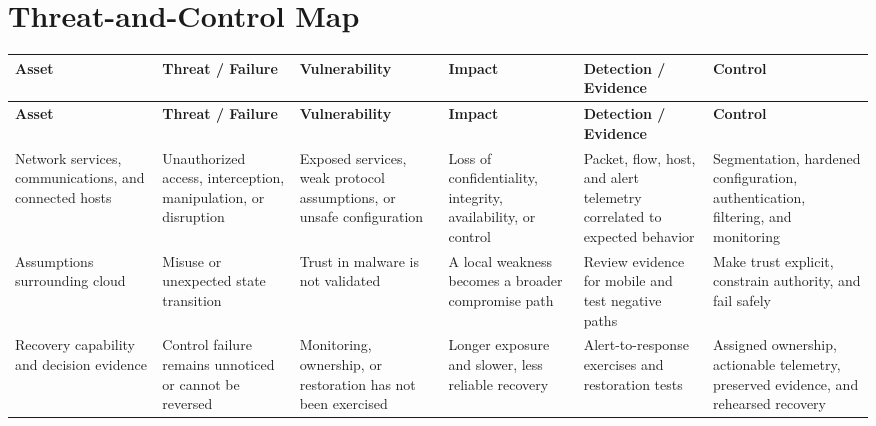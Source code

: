 \documentclass[11pt,letterpaper]{article}
\begin{document}
\section*{Threat-and-Control Map}
\begingroup\scriptsize\setlength{\tabcolsep}{2pt}
\begin{longtable}{>{\raggedright\arraybackslash}p{}>{\raggedright\arraybackslash}p{}>{\raggedright\arraybackslash}p{}>{\raggedright\arraybackslash}p{}>{\raggedright\arraybackslash}p{}>{\raggedright\arraybackslash}p{}}
\toprule\rowcolor{Navy}\color{white}\textbf{Asset} & \color{white}\textbf{Threat / Failure} & \color{white}\textbf{Vulnerability} & \color{white}\textbf{Impact} & \color{white}\textbf{Detection / Evidence} & \color{white}\textbf{Control}\\\midrule
\endfirsthead
\toprule\rowcolor{Navy}\color{white}\textbf{Asset} & \color{white}\textbf{Threat / Failure} & \color{white}\textbf{Vulnerability} & \color{white}\textbf{Impact} & \color{white}\textbf{Detection / Evidence} & \color{white}\textbf{Control}\\\midrule
\endhead
Network services, communications, and connected hosts & Unauthorized access, interception, manipulation, or disruption & Exposed services, weak protocol assumptions, or unsafe configuration & Loss of confidentiality, integrity, availability, or control & Packet, flow, host, and alert telemetry correlated to expected behavior & Segmentation, hardened configuration, authentication, filtering, and monitoring\\\midrule
Assumptions surrounding cloud & Misuse or unexpected state transition & Trust in malware is not validated & A local weakness becomes a broader compromise path & Review evidence for mobile and test negative paths & Make trust explicit, constrain authority, and fail safely\\\midrule
Recovery capability and decision evidence & Control failure remains unnoticed or cannot be reversed & Monitoring, ownership, or restoration has not been exercised & Longer exposure and slower, less reliable recovery & Alert-to-response exercises and restoration tests & Assigned ownership, actionable telemetry, preserved evidence, and rehearsed recovery\\\midrule
\bottomrule
\end{longtable}
\endgroup
\end{document}
